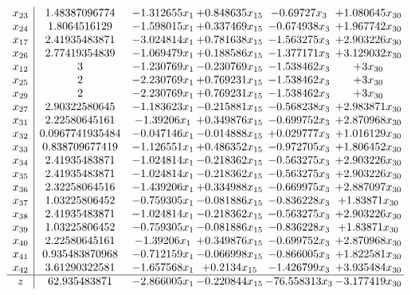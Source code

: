 \documentclass[11pt]{article}
\begin{document}
\[\begin{array}{c| c c@{\hskip 2pt} c@{\hskip 2pt} c@{\hskip 2pt} c@{\hskip 2pt} }
 x_{23}   &  1.48387096774 & -1.312655 x_{1} & + 0.848635 x_{15} & -0.69727 x_{3} & + 1.080645 x_{30}\\
 x_{24}   &  1.8064516129 & -1.598015 x_{1} & + 0.337469 x_{15} & -0.674938 x_{3} & + 1.967742 x_{30}\\
 x_{17}   &  2.41935483871 & -3.024814 x_{1} & + 0.781638 x_{15} & -1.563275 x_{3} & + 2.903226 x_{30}\\
 x_{26}   &  2.77419354839 & -1.069479 x_{1} & + 0.188586 x_{15} & -1.377171 x_{3} & + 3.129032 x_{30}\\
 x_{12}   &  3 & -1.230769 x_{1} & -0.230769 x_{15} & -1.538462 x_{3} & + 3 x_{30}\\
 x_{25}   &  2 & -2.230769 x_{1} & + 0.769231 x_{15} & -1.538462 x_{3} & + 3 x_{30}\\
 x_{29}   &  2 & -2.230769 x_{1} & + 0.769231 x_{15} & -1.538462 x_{3} & + 3 x_{30}\\
 x_{27}   &  2.90322580645 & -1.183623 x_{1} & -0.215881 x_{15} & -0.568238 x_{3} & + 2.983871 x_{30}\\
 x_{31}   &  2.22580645161 & -1.39206 x_{1} & + 0.349876 x_{15} & -0.699752 x_{3} & + 2.870968 x_{30}\\
 x_{32}   &  0.0967741935484 & -0.047146 x_{1} & -0.014888 x_{15} & + 0.029777 x_{3} & + 1.016129 x_{30}\\
 x_{33}   &  0.838709677419 & -1.126551 x_{1} & + 0.486352 x_{15} & -0.972705 x_{3} & + 1.806452 x_{30}\\
 x_{34}   &  2.41935483871 & -1.024814 x_{1} & -0.218362 x_{15} & -0.563275 x_{3} & + 2.903226 x_{30}\\
 x_{35}   &  2.41935483871 & -1.024814 x_{1} & -0.218362 x_{15} & -0.563275 x_{3} & + 2.903226 x_{30}\\
 x_{36}   &  2.32258064516 & -1.439206 x_{1} & + 0.334988 x_{15} & -0.669975 x_{3} & + 2.887097 x_{30}\\
 x_{37}   &  1.03225806452 & -0.759305 x_{1} & -0.081886 x_{15} & -0.836228 x_{3} & + 1.83871 x_{30}\\
 x_{38}   &  2.41935483871 & -1.024814 x_{1} & -0.218362 x_{15} & -0.563275 x_{3} & + 2.903226 x_{30}\\
 x_{39}   &  1.03225806452 & -0.759305 x_{1} & -0.081886 x_{15} & -0.836228 x_{3} & + 1.83871 x_{30}\\
 x_{40}   &  2.22580645161 & -1.39206 x_{1} & + 0.349876 x_{15} & -0.699752 x_{3} & + 2.870968 x_{30}\\
 x_{41}   &  0.935483870968 & -0.712159 x_{1} & -0.066998 x_{15} & -0.866005 x_{3} & + 1.822581 x_{30}\\
 x_{42}   &  3.61290322581 & -1.657568 x_{1} & + 0.2134 x_{15} & -1.426799 x_{3} & + 3.935484 x_{30}\\
\hline
z    &  62.935483871 & -2.866005 x_{1} & -0.220844 x_{15} & -76.558313 x_{3} & -3.177419 x_{30}\\
\end{array}\]
\end{document}
